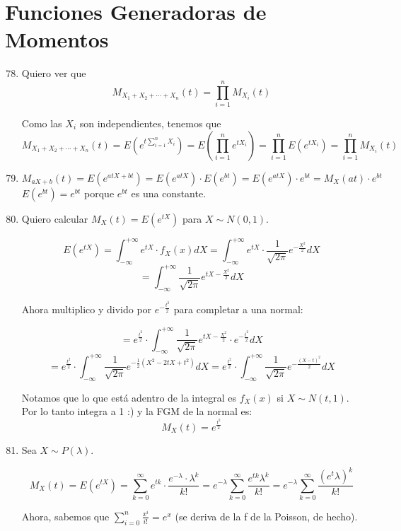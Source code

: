 \section{Funciones Generadoras de Momentos}
\begin{enumerate}
	\setcounter{enumi}{77}
	\item
		Quiero ver que $$M_{X_1+X_2+\cdots +X_n}(t) = \prod_{i=1}^n M_{X_i}(t)$$
		
		Como las $X_i$ son independientes, tenemos que
		$$M_{X_1+X_2+\cdots +X_n}(t) = E(e^{t\sum_{i=1}^n X_i}) = E(\prod_{i=1}^n e^{tX_i}) = \prod_{i=1}^n E(e^{tX_i}) = \prod_{i=1}^n M_{X_i}(t)$$
		
	\item
		$$M_{aX+b}(t) = E(e^{atX+bt}) = E(e^{atX})\cdot E(e^{bt}) = E(e^{atX})\cdot e^{bt} = M_{X}(at)\cdot e^{bt}$$
		$E(e^{bt}) = e^{bt}$  porque $e^{bt}$ es una constante.
		
	\item
		Quiero calcular $M_X(t) = E(e^{tX})$ para $X\sim N(0,1)$.
		
		$$E(e^{tX}) = \int_{-\infty}^{+\infty}e^{tX}\cdot f_X(x) dX = \int_{-\infty}^{+\infty}e^{tX}\cdot \frac{1}{\sqrt{2\pi}} e^{-\frac{X^2}{2}} dX$$
		$$ = \int_{-\infty}^{+\infty}\frac{1}{\sqrt{2\pi}} e^{tX-\frac{X^2}{2}} dX$$
		
		Ahora multiplico y divido por $e^{-\frac{t^2}{2}}$ para completar a una normal:
		
		$$ = e^{\frac{t^2}{2}} \cdot \int_{-\infty}^{+\infty}\frac{1}{\sqrt{2\pi}} e^{tX-\frac{X^2}{2}} \cdot e^{-\frac{t^2}{2}} dX$$
		$$ = e^{\frac{t^2}{2}} \cdot \int_{-\infty}^{+\infty}\frac{1}{\sqrt{2\pi}} e^{-\frac{1}{2}(X^2 - 2tX + t^2)} dX
		= e^{\frac{t^2}{2}} \cdot \int_{-\infty}^{+\infty}\frac{1}{\sqrt{2\pi}} e^{-\frac{(X-t)^2}{2}} dX$$
		
		Notamos que lo que está adentro de la integral es $f_X(x)$ si $X\sim N(t, 1)$. Por lo tanto integra a 1 :) y la FGM de la normal es:
		$$M_X(t) = e^{\frac{t^2}{2}}$$
		
	\item
		Sea $X \sim P(\lambda)$.
		
		$$M_X(t) = E(e^{tX}) = \sum_{k=0}^{\infty}e^{tk}\cdot\frac{e^{-\lambda}\cdot \lambda^k}{k!}
		= e^{-\lambda} \sum_{k=0}^{\infty}\frac{e^{tk}\lambda^k}{k!} = e^{-\lambda} \sum_{k=0}^{\infty}\frac{(e^t\lambda)^k}{k!}$$
		
		Ahora, sabemos que $\sum_{i=0}^n \frac{x^i}{i!} = e^x$ (se deriva de la f de la Poisson, de hecho).
		

\end{enumerate}
